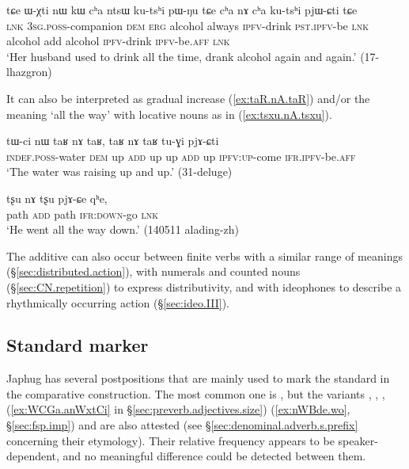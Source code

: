  \begin{exe}
\ex  \label{ex:cha.nA.cha}
\gll  tɕe ɯ-χti nɯ kɯ cʰa ntsɯ ku-tsʰi pɯ-ŋu tɕe cʰa nɤ cʰa ku-tsʰi pjɯ-ɕti tɕe \\
\textsc{lnk} \textsc{3sg}.\textsc{poss}-companion \textsc{dem} \textsc{erg} alcohol always \textsc{ipfv}-drink \textsc{pst}.\textsc{ipfv}-be \textsc{lnk} alcohol add alcohol \textsc{ipfv}-drink \textsc{ipfv}-be.\textsc{aff} \textsc{lnk} \\
\glt  `Her husband used to drink all the time, drank alcohol again and again.' (17-lhazgron)
\end{exe} 

It can also be interpreted as gradual increase (\ref{ex:taR.nA.taR}) and/or the meaning `all the way' with locative nouns as in (\ref{ex:tsxu.nA.tsxu}).

\begin{exe}
\ex  \label{ex:taR.nA.taR}
\gll tɯ-ci nɯ taʁ nɤ taʁ, taʁ nɤ taʁ tu-ɣi pjɤ-ɕti \\
\textsc{indef}.\textsc{poss}-water  \textsc{dem} up \textsc{add}  up up \textsc{add} up \textsc{ipfv}:\textsc{up}-come \textsc{ifr}.\textsc{ipfv}-be.\textsc{aff} \\
\glt `The water was raising up and up.' (31-deluge)
\end{exe} 

\begin{exe}
\ex  \label{ex:tsxu.nA.tsxu}
\gll  tʂu nɤ tʂu pjɤ-ɕe qʰe, \\
path \textsc{add} path \textsc{ifr}:\textsc{down}-go \textsc{lnk} \\
\glt `He went all the way down.' (140511 alading-zh) 
\end{exe} 

The additive can also occur between finite verbs with a similar range of meanings (§\ref{sec:distributed.action}), with numerals and counted nouns (§\ref{sec:CN.repetition}) to express distributivity, and with ideophones to describe a rhythmically occurring action (§\ref{sec:ideo.III}).

\subsection{Standard marker} \label{sec:comparative} 
Japhug has several postpositions that are mainly used to mark the standard in the comparative construction. The most common one is , but the variants , , ,  (\ref{ex:WCGa.anWxtCi} in §\ref{sec:preverb.adjectives.size})   (\ref{ex:nWBde.wo}, §\ref{sec:fsp.imp}) and  are also attested (see §\ref{sec:denominal.adverb.s.prefix} concerning their etymology). Their relative frequency appears to be speaker-dependent, and no meaningful difference could be detected between them. 

